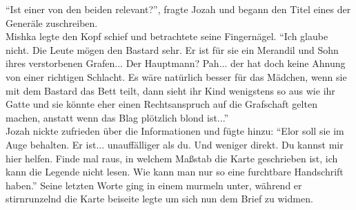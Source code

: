 ``Ist einer von den beiden relevant?'', fragte Jozah und begann den Titel eines der Generäle 
zuschreiben.\\
Mishka legte den Kopf schief und betrachtete seine Fingernägel. ``Ich glaube nicht. Die Leute mögen 
den Bastard sehr. Er ist für sie ein Merandil und Sohn ihres verstorbenen Grafen... Der Hauptmann? 
Pah... der hat doch keine Ahnung von einer richtigen Schlacht. Es wäre natürlich besser für das 
Mädchen, wenn sie mit dem Bastard das Bett teilt, dann sieht ihr Kind wenigstens so aus wie ihr 
Gatte und sie könnte eher einen Rechtsanspruch auf die Grafschaft gelten machen, anstatt wenn das 
Blag plötzlich blond ist...''\\
Jozah nickte zufrieden über die Informationen und fügte hinzu: ``Elor soll sie im Auge behalten. Er 
ist... unauffälliger als du. Und weniger direkt. Du kannst mir hier helfen. Finde mal raus, in 
welchem Maßstab die Karte geschrieben ist, ich kann die Legende nicht lesen. Wie kann man nur so 
eine furchtbare Handschrift haben.'' Seine letzten Worte ging in einem murmeln unter, während er 
stirnrunzelnd die Karte beiseite legte um sich nun dem Brief zu widmen.\\


